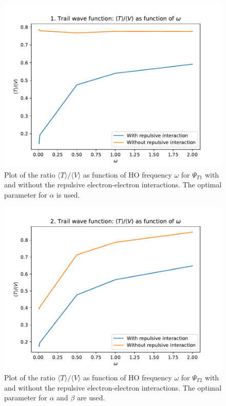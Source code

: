 \documentclass[12pt,english,a4paper]{article}
\begin{document}
\begin{figure}[H]
    \centering
    \includegraphics[scale=0.7]{../figures/plot_virial_trail_1.pdf}
    \caption{Plot of the ratio $\langle T\rangle / \langle V\rangle$ as function of HO frequency $\omega$ for $\Psi_{T1}$ with and without the repulsive electron-electron interactions. The optimal parameter for $\alpha$ is used.}
    \label{fig:virial_trail_1}
\end{figure}
\begin{figure}[H]
    \centering
    \includegraphics[scale=0.7]{../figures/plot_virial_trail_2.pdf}
    \caption{Plot of the ratio $\langle T\rangle / \langle V\rangle$ as function of HO frequency $\omega$ for $\Psi_{T2}$ with and without the repulsive electron-electron interactions. The optimal parameter for $\alpha$ and $\beta$ are used.}
    \label{fig:virial_trail_2}
\end{figure}
\end{document}
